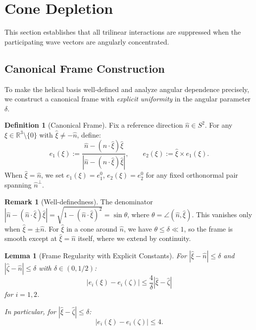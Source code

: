 \documentclass[11pt]{article}
\newtheorem{lemma}[theorem]{Lemma}
\theoremstyle{definition}
\newtheorem{definition}[theorem]{Definition}
\newtheorem{remark}[theorem]{Remark}
\newcommand{\R}{\mathbb{R}}
\begin{document}
\section{Cone Depletion}\label{sec:cone}

This section establishes that all trilinear interactions are suppressed when the participating wave vectors are angularly concentrated.

\subsection{Canonical Frame Construction}\label{sec:frame}

To make the helical basis well-defined and analyze angular dependence precisely, we construct a canonical frame with \emph{explicit uniformity} in the angular parameter $\delta$.

\begin{definition}[Canonical Frame]
Fix a reference direction $\hat{n} \in S^2$. For any $\xi \in \R^3 \setminus \{0\}$ with $\hat{\xi} \neq -\hat{n}$, define:
\begin{equation}
e_1(\xi) := \frac{\hat{n} - (\hat{n} \cdot \hat{\xi})\hat{\xi}}{|\hat{n} - (\hat{n} \cdot \hat{\xi})\hat{\xi}|}, \qquad e_2(\xi) := \hat{\xi} \times e_1(\xi).
\end{equation}
When $\hat{\xi} = \hat{n}$, we set $e_1(\xi) = e_1^0$, $e_2(\xi) = e_2^0$ for any fixed orthonormal pair spanning $\hat{n}^\perp$.
\end{definition}

\begin{remark}[Well-definedness]
The denominator $|\hat{n} - (\hat{n} \cdot \hat{\xi})\hat{\xi}| = \sqrt{1 - (\hat{n} \cdot \hat{\xi})^2} = \sin\theta$, where $\theta = \angle(\hat{n}, \hat{\xi})$. This vanishes only when $\hat{\xi} = \pm\hat{n}$. For $\hat{\xi}$ in a cone around $\hat{n}$, we have $\theta \leq \delta \ll 1$, so the frame is smooth except at $\hat{\xi} = \hat{n}$ itself, where we extend by continuity.
\end{remark}

\begin{lemma}[Frame Regularity with Explicit Constants]\label{lem:frame}
For $|\hat{\xi} - \hat{n}| \leq \delta$ and $|\hat{\zeta} - \hat{n}| \leq \delta$ with $\delta \in (0, 1/2)$:
\begin{equation}\label{eq:frame-lip}
|e_i(\xi) - e_i(\zeta)| \leq \frac{4}{\delta}|\hat{\xi} - \hat{\zeta}|
\end{equation}
for $i = 1, 2$.

In particular, for $|\hat{\xi} - \hat{\zeta}| \leq \delta$:
\begin{equation}\label{eq:frame-bound}
|e_i(\xi) - e_i(\zeta)| \leq 4.
\end{equation}
\end{lemma}
\end{document}
